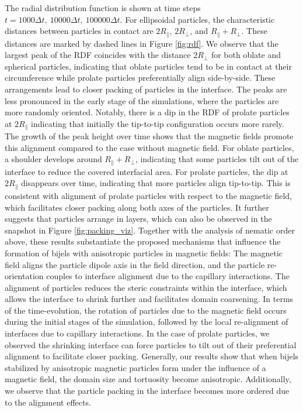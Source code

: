 The radial distribution function is shown at time steps
\(t=1000\Delta t,\ 10000\Delta t,\ 100000\Delta t\). For ellipsoidal
particles, the characteristic distances between particles in contact are
\(2R_{\parallel}\), \(2R_{\perp}\), and \(R_{\parallel} + R_{\perp}\).
These distances are marked by dashed lines in Figure \ref{fig:rdf}. We
observe that the largest peak of the RDF coincides with the distance
\(2R_\perp\) for both oblate and spherical particles, indicating that
oblate particles tend to be in contact at their circumference while
prolate particles preferentially align side-by-side. These arrangements
lead to closer packing of particles in the interface. The peaks are less
pronounced in the early stage of the simulations, where the particles
are more randomly oriented. Notably, there is a dip in the RDF of
prolate particles at \(2R_\parallel\) indicating that initially the
tip-to-tip configuration occurs more rarely. The growth of the peak
height over time shows that the magnetic fields promote this alignment
compared to the case without magnetic field. For oblate particles, a
shoulder develops around \(R_\parallel+R_\perp\), indicating that some
particles tilt out of the interface to reduce the covered interfacial
area. For prolate particles, the dip at \(2R_\parallel\) disappears over
time, indicating that more particles align tip-to-tip. This is
consistent with alignment of prolate particles with respect to the
magnetic field, which facilitates closer packing along both axes of the
particles. It further suggests that particles arrange in layers, which can also be observed in the snapshot in Figure
\ref{fig:packing_viz}. Together with the analysis of nematic order
above, these results substantiate the proposed mechanisms that influence
the formation of bijels with anisotropic particles in magnetic fields:
The magnetic field aligns the particle dipole axis in the field
direction, and the particle re-orientation couples to interface
alignment due to the capillary interactions. The alignment of particles
reduces the steric constraints within the interface, which allows the
interface to shrink further and facilitates domain coarsening. In terms
of the time-evolution, the rotation of particles due to the magnetic
field occurs during the initial stages of the simulation, followed by
the local re-alignment of interfaces due to capillary interactions. In
the case of prolate particles, we observed the shrinking interface can
force particles to tilt out of their preferential alignment to facilitate
closer packing. Generally, our results show that when bijels stabilized
by anisotropic magnetic particles form under the influence of a magnetic
field, the domain size and tortuosity become anisotropic. Additionally,
we observe that the particle packing in the interface becomes more
ordered due to the alignment effects.

